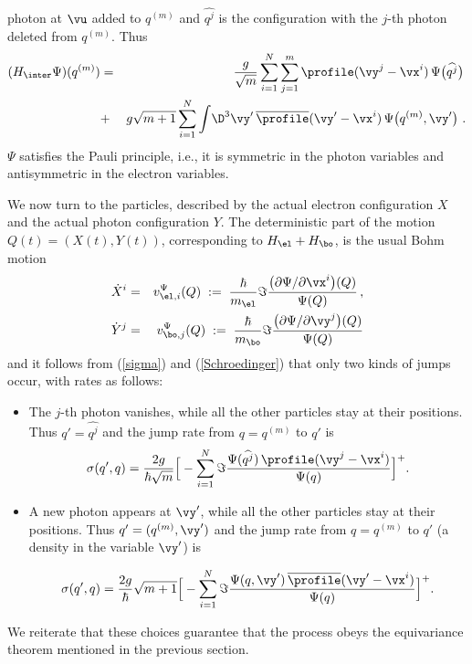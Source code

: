 \documentclass[12pt]{article}
\begin{document}
photon at $\vu$ added to $q^{(m)}$ and $\widehat{q^j}$ is the configuration
with the $j$-th photon deleted from $q^{(m)}$. Thus
\begin{eqnarray}\label{Schroedinger}
  (H_{\inter}\Psi)(q^{(m)})
&=& 
  \frac{g}{\sqrt{m}} \sum_{i=1}^N \sum_{j=1}^m \profile(\vy^j-\vx^i)
  \, \Psi \big(\widehat{q^j}\big) \, 
  \\\nonumber
  &+&
  g\sqrt{m+1} \sum_{i=1}^N  \int \!\D^3 \vy'\,
  \overline\profile (\vy'-\vx^i) \, \Psi \big(q^{(m)},\vy'\big)\ .
\end{eqnarray}
$\Psi$ satisfies the Pauli principle, i.e., it is symmetric in the photon
variables and antisymmetric in the electron variables.

We now turn to the particles, described by the actual electron configuration $X$
and the actual photon configuration $Y$.   The deterministic part of the
motion $Q(t)=(X(t),Y(t))$,
corresponding to $H_{\el}+ H_{\bo}$, is the usual Bohm motion
\begin{eqnarray}
 \label{EqMotionA}
  \dot{X}^{i} 
  &=&
  v_{\el,i}^{\Psi}(Q)\; := \;\frac{\hbar}{m_\el} \Im
  \frac{\big(\partial \Psi/\partial \vx^{i}\big)
  (Q)}{\Psi(Q)}\,,
  \\
 \label{EqMotionB}
  \dot{Y}^{j} 
  &=&
  v_{\bo,j}^{\Psi}(Q)\; :=
  \;\frac{\hbar}{m_\bo} \Im
  \frac{\big(\partial \Psi/\partial \vy^{j}\big)
  (Q)}{\Psi(Q)}
\end{eqnarray}
and it follows from  (\ref{sigma}) and (\ref{Schroedinger}) that only two kinds of
jumps occur, with rates as follows: 
\begin{itemize}
\item The $j$-th photon vanishes, while all the other particles stay at
their positions. Thus $q'=\widehat{q^j}$ and the jump rate from
$q=q^{(m)}$ to $q'$ is
\begin{equation}\label{annrate}
\sigma(q',q) =   \frac{2g}{\hbar\sqrt{m}} \Big[ -\sum_{i=1}^N \Im 
  \frac{\Psi(\widehat{q^j}) \,
  \profile(\vy^j-\vx^i)}{\Psi(q)} \Big]^+.
\end{equation}

\item A new photon appears at  $\vy'$, while all the other particles stay at
their positions. Thus $q'=(q^{(m)},\vy')$ and the jump rate from
$q=q^{(m)}$ to $q'$ (a density in the variable $\vy'$) is 

\begin{equation}\label{destinationdistribution}
\sigma(q',q) =   \frac{2g}{\hbar}\sqrt{m+1}
  \Big[ -\sum_{i=1}^N \Im \frac{\Psi(q,\vy')
  \,\overline\profile (\vy'-\vx^i)}{\Psi(q)} \Big]^+.
\end{equation}
\end{itemize}
We reiterate that these choices guarantee that the process obeys the
equivariance theorem mentioned in the previous section.
\end{document}

